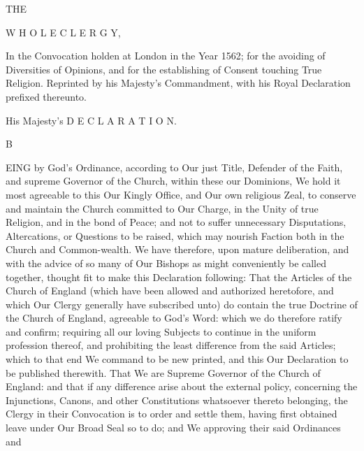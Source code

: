 THE

W H O L E C L E R G Y,

In the Convocation holden at London in the Year 1562; for the avoiding of Diversities of Opinions, and for the establishing of Consent touching True Religion. Reprinted by his Majesty’s Commandment, with his Royal Declaration prefixed thereunto.

His Majesty’s D E C L A R A T I O N.

B

EING by God’s Ordinance, according to Our just Title, Defender of the Faith, and supreme Governor of the Church, within these our Dominions, We hold it most agreeable to this Our Kingly Office, and Our own religious Zeal, to conserve and maintain the Church committed to Our Charge, in the Unity of true Religion, and in the bond of Peace; and not to suffer unnecessary Disputations, Altercations, or Questions to be raised, which may nourish Faction both in the Church and Common-wealth. We have therefore, upon mature deliberation, and with the advice of so many of Our Bishops as might conveniently be called together, thought fit to make this Declaration following: That the Articles of the Church of England (which have been allowed and authorized heretofore, and which Our Clergy generally have subscribed unto) do contain the true Doctrine of the Church of England, agreeable to God’s Word: which we do therefore ratify and confirm; requiring all our loving Subjects to continue in the uniform profession thereof, and prohibiting the least difference from the said Articles; which to that end We command to be new printed, and this Our Declaration to be published therewith. That We are Supreme Governor of the Church of England: and that if any difference arise about the external policy, concerning the Injunctions, Canons, and other Constitutions whatsoever thereto belonging, the Clergy in their Convocation is to order and settle them, having first obtained leave under Our Broad Seal so to do; and We approving their said Ordinances and

